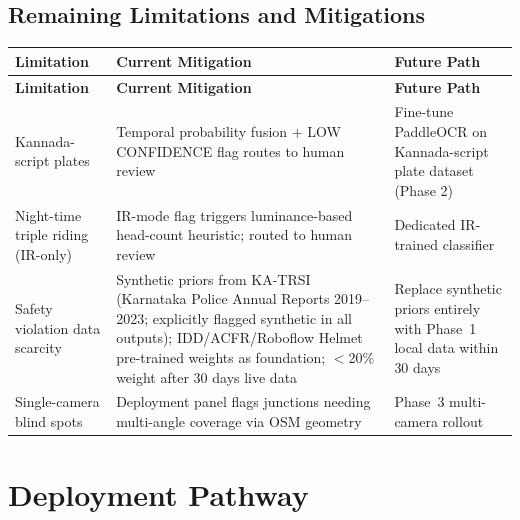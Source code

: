 \documentclass[11pt,a4paper]{article}
\begin{document}
\subsection*{Remaining Limitations and Mitigations}

\begin{longtable}{L{3.5cm} L{5.5cm} L{5.5cm}}
    \toprule
    \color{white}\textbf{Limitation} & \color{white}\textbf{Current Mitigation} & \color{white}\textbf{Future Path} \\
    \midrule
    \endfirsthead
    \toprule
    \color{white}\textbf{Limitation} & \color{white}\textbf{Current Mitigation} & \color{white}\textbf{Future Path} \\
    \midrule
    \endhead
    \bottomrule
    \endfoot

    Kannada-script plates & Temporal probability fusion + LOW CONFIDENCE flag routes to human review & Fine-tune PaddleOCR on Kannada-script plate dataset (Phase 2) \\
    Night-time triple riding (IR-only) & IR-mode flag triggers luminance-based head-count heuristic; routed to human review & Dedicated IR-trained classifier \\
    Safety violation data scarcity & Synthetic priors from KA-TRSI~\cite{katrsi2023} (Karnataka Police Annual Reports 2019--2023; explicitly flagged synthetic in all outputs); IDD/ACFR/Roboflow Helmet pre-trained weights as foundation; $<$20\% weight after 30 days live data & Replace synthetic priors entirely with Phase~1 local data within 30 days \\
    Single-camera blind spots & Deployment panel flags junctions needing multi-angle coverage via OSM geometry & Phase~3 multi-camera rollout \\
\end{longtable}

\section{Deployment Pathway}
\end{document}
